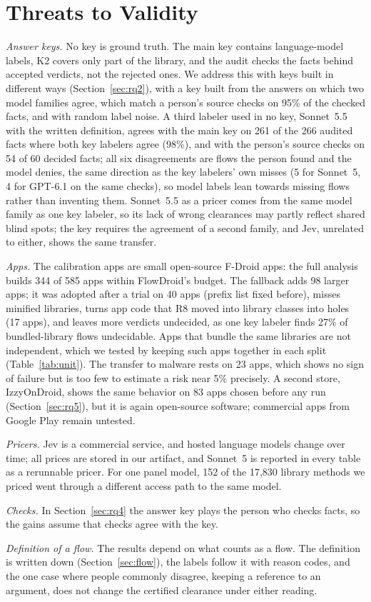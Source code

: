 \section{Threats to Validity}
\label{sec:threats}

\emph{Answer keys.}
No key is ground truth.
The main key contains language-model labels, K2 covers only part of the library, and the audit checks the facts behind accepted verdicts, not the rejected ones.
We address this with keys built in different ways (Section~\ref{sec:rq2}), with a key built from the answers on which two model families agree, which match a person's source checks on 95\% of the checked facts, and with random label noise.
A third labeler used in no key, Sonnet~5.5 with the written definition, agrees with the main key on 261 of the 266 audited facts where both key labelers agree (98\%), and with the person's source checks on 54 of 60 decided facts; all six disagreements are flows the person found and the model denies, the same direction as the key labelers' own misses (5 for Sonnet~5, 4 for GPT-6.1 on the same checks), so model labels lean towards missing flows rather than inventing them.
Sonnet~5.5 as a pricer comes from the same model family as one key labeler, so its lack of wrong clearances may partly reflect shared blind spots; the key requires the agreement of a second family, and Jev, unrelated to either, shows the same transfer.

\emph{Apps.}
The calibration apps are small open-source F-Droid apps: the full analysis builds 344 of 585 apps within FlowDroid's budget.
The fallback adds 98 larger apps; it was adopted after a trial on 40 apps (prefix list fixed before), misses minified libraries, turns app code that R8 moved into library classes into holes (17 apps), and leaves more verdicts undecided, as one key labeler finds 27\% of bundled-library flows undecidable.
Apps that bundle the same libraries are not independent, which we tested by keeping such apps together in each split (Table~\ref{tab:unit}).
The transfer to malware rests on 23 apps, which shows no sign of failure but is too few to estimate a risk near 5\% precisely.
A second store, IzzyOnDroid, shows the same behavior on 83 apps chosen before any run (Section~\ref{sec:rq5}), but it is again open-source software; commercial apps from Google Play remain untested.

\emph{Pricers.}
Jev is a commercial service, and hosted language models change over time; all prices are stored in our artifact, and Sonnet~5 is reported in every table as a rerunnable pricer.
For one panel model, 152 of the 17{,}830 library methods we priced went through a different access path to the same model.

\emph{Checks.}
In Section~\ref{sec:rq4} the answer key plays the person who checks facts, so the gains assume that checks agree with the key.

\emph{Definition of a flow.}
The results depend on what counts as a flow.
The definition is written down (Section~\ref{sec:flow}), the labels follow it with reason codes, and the one case where people commonly disagree, keeping a reference to an argument, does not change the certified clearance under either reading.

